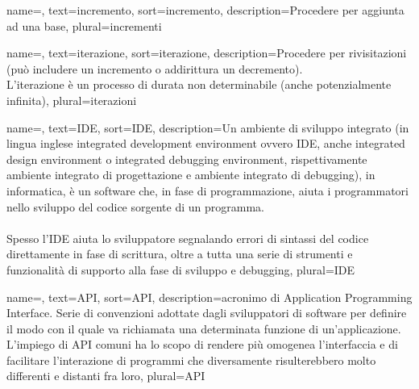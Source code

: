 
\renewcommand{\acronymname}{Acronimi e abbreviazioni}




{
    name=,
    text=incremento,
    sort=incremento,
    description={Procedere per aggiunta ad una base},
    plural=incrementi
}

{
    name=,
    text=iterazione,
    sort=iterazione,
    description={Procedere per rivisitazioni (può includere un incremento o addirittura un decremento).\\L'iterazione è un processo di durata non determinabile (anche potenzialmente infinita)},
    plural=iterazioni
}

{
	name=,
	text=IDE,
	sort=IDE,
	description={Un ambiente di sviluppo integrato (in lingua inglese integrated development environment ovvero IDE, anche integrated design environment o integrated debugging environment, rispettivamente ambiente integrato di progettazione e ambiente integrato di debugging), in informatica, è un software che, in fase di programmazione, aiuta i programmatori nello sviluppo del codice sorgente di un programma.\\ \\
	Spesso l'IDE aiuta lo sviluppatore segnalando errori di sintassi del codice direttamente in fase di scrittura, oltre a tutta una serie di strumenti e funzionalità di supporto alla fase di sviluppo e debugging\cite{site:wikipediaIDE}},
	plural=IDE
}


{
	name=,
	text=API,
	sort=API,
	description={acronimo di Application Programming Interface. Serie di convenzioni adottate dagli sviluppatori di software per definire il modo con il quale va richiamata una determinata funzione di un'applicazione. L'impiego di API comuni ha lo scopo di rendere più omogenea l'interfaccia e di facilitare l'interazione di programmi che diversamente risulterebbero molto differenti e distanti fra loro\cite{site:api}},
	plural=API
}


